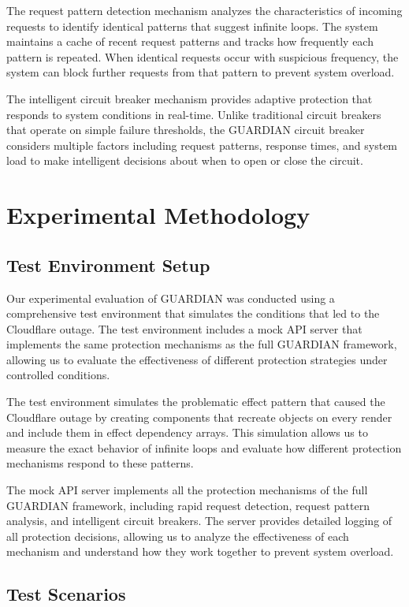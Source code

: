 \documentclass[10pt]{article}
\begin{document}
The request pattern detection mechanism analyzes the characteristics of incoming requests to identify identical patterns that suggest infinite loops. The system maintains a cache of recent request patterns and tracks how frequently each pattern is repeated. When identical requests occur with suspicious frequency, the system can block further requests from that pattern to prevent system overload.

The intelligent circuit breaker mechanism provides adaptive protection that responds to system conditions in real-time. Unlike traditional circuit breakers that operate on simple failure thresholds, the GUARDIAN circuit breaker considers multiple factors including request patterns, response times, and system load to make intelligent decisions about when to open or close the circuit.

\section{Experimental Methodology}

\subsection{Test Environment Setup}

Our experimental evaluation of GUARDIAN was conducted using a comprehensive test environment that simulates the conditions that led to the Cloudflare outage. The test environment includes a mock API server that implements the same protection mechanisms as the full GUARDIAN framework, allowing us to evaluate the effectiveness of different protection strategies under controlled conditions.

The test environment simulates the problematic effect pattern that caused the Cloudflare outage by creating components that recreate objects on every render and include them in effect dependency arrays. This simulation allows us to measure the exact behavior of infinite loops and evaluate how different protection mechanisms respond to these patterns.

The mock API server implements all the protection mechanisms of the full GUARDIAN framework, including rapid request detection, request pattern analysis, and intelligent circuit breakers. The server provides detailed logging of all protection decisions, allowing us to analyze the effectiveness of each mechanism and understand how they work together to prevent system overload.

\subsection{Test Scenarios}
\end{document}
